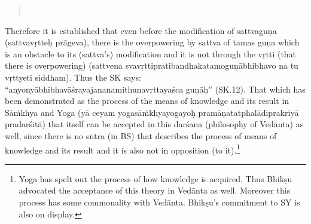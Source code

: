 \eject

\begin{verse}
\\
\end{verse}

Therefore it is established that even before the modification of sattvaguṇa (sattvavṛtteḥ prāgeva), there is the overpowering by sattva of tamas guṇa which is an obstacle to its (sattva’s) modification and it is not through the vṛtti (that there is overpowering) (sattvena svavṛttipratibandhakatamoguṇābhibhavo na tu vṛttyeti siddham). Thus the SK says: “anyonyābhibhavāśrayajananamithunavṛttayaśca guṇāḥ” (SK.12).  That which has been demonstrated as the process of the means of knowledge and its result in Sāṁkhya and Yoga (yā ceyam yogasāṁkhyayogayoḥ pramāṇatatphalādiprakriyā pradarśitā) that itself can   be accepted in this darśana (philosophy of Vedānta) as well, since there is no sūtra (in BS) that describes the process of means of knowledge and its result and it is also not in opposition (to it).\footnote{Yoga has spelt out the process of how knowledge is acquired. Thus Bhikṣu advocated the acceptance of this theory in Vedānta as well. Moreover this process has some commonality with Vedānta. Bhikṣu’s commitment to SY is also on display.}  

